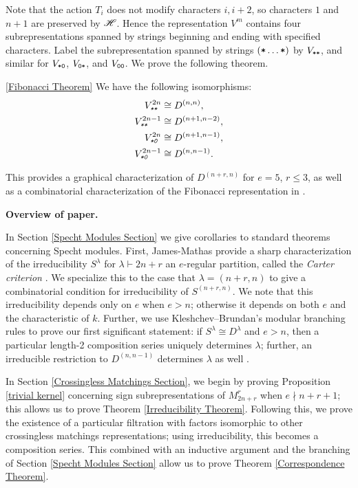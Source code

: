 \documentclass{amsart}
\def\thmcolor{black!60!orange}
\newcommand{\fakesubsection}[1]{
    \vspace{7pt}
    \noindent \textbf{#1.}
  }
\begin{document}
  Note that the action $T_i$ does not modify characters $i,i+2$, so characters $1$ and $n+1$ are preserved by $\mathscr{H}$.
  Hence the representation $V^m$ contains four subrepresentations spanned by strings beginning and ending with specified characters.
  Label the subrepresentation spanned by strings $(\texttt{*}\dots\texttt{*})$ by $V_{\texttt{*}\texttt{*}}$, and similar for $V_{\texttt{*}\texttt{0}}$, $V_{\texttt{0}\texttt{*}}$, and $V_{\texttt{0}\texttt{0}}$.
  We prove the following theorem.
  \begingroup
  \hypersetup{linkcolor=\thmcolor}
  \begin{customthm}{\ref{Fibonacci Theorem}}
    We have the following isomorphisms:
    \begin{align*}  
      \emph{$V^{2n}_{\texttt{*}\texttt{*}}$} &\cong D^{(n,n)},\\ 
      \emph{$V^{2n-1}_{\texttt{*}\texttt{*}}$} &\cong D^{(n+1,n-2)},\\
      \emph{$V^{2n}_{\texttt{*}\texttt{0}}$} &\cong D^{(n+1,n-1)},\\
      \emph{$V^{2n-1}_{\texttt{*}\texttt{0}}$} &\cong D^{(n,n-1)}.
    \end{align*}
  \end{customthm}
  \endgroup
  This provides a graphical characterization of $D^{(n+r,n)}$ for $e = 5$, $r \leq 3$, as well as a combinatorial characterization of the Fibonacci representation in \cite{Shor}.

  \fakesubsection{Overview of paper}
  
  In Section \ref{Specht Modules Section} we give corollaries to standard theorems concerning Specht modules.
  First, James-Mathas provide a sharp characterization of the irreducibility $S^\lambda$ for $\lambda \vdash 2n + r$ an $e$-regular partition, called the \emph{Carter criterion} \cite[Thm.~5.42]{Mathas-book}.
  We specialize this to the case that $\lambda = (n+r,n)$ to give a combinatorial condition for irreducibility of $S^{(n+r,n)}$.
  We note that this irreducibility depends only on $e$ when $e > n$;
  otherwise it depends on both $e$ and the characteristic of $k$.
  Further, we use Kleshchev--Brundan's modular branching rules to prove our first significant statement: if $S^\lambda \cong D^\lambda$ and $e > n$, then a particular length-2 composition series uniquely determines $\lambda$;
  further, an irreducible restriction to $D^{(n,n-1)}$ determines $\lambda$ as well \cite{Kleshchev, Brundan}.

  \vspace{5pt}
  In Section \ref{Crossingless Matchings Section}, we begin by proving Proposition \ref{trivial kernel} concerning sign subrepresentations of $M_{2n + r}^r$ when $e \nmid n + r + 1$;
  this allows us to prove Theorem \ref{Irreducibility Theorem}.
  Following this, we prove the existence of a particular filtration with factors isomorphic to other crossingless matchings representations;
  using irreducibility, this becomes a composition series.
  This combined with an inductive argument and the branching of Section \ref{Specht Modules Section} allow us to prove Theorem \ref{Correspondence Theorem}.
  
\end{document}
